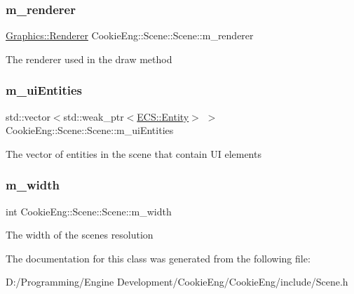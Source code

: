 \subsubsection{\texorpdfstring{m\+\_\+renderer}{m\_renderer}}
{\footnotesize\ttfamily \hyperlink{class_cookie_eng_1_1_graphics_1_1_renderer}{Graphics\+::\+Renderer} Cookie\+Eng\+::\+Scene\+::\+Scene\+::m\+\_\+renderer\hspace{0.3cm}{\ttfamily [protected]}}

The renderer used in the draw method \mbox{\label{class_cookie_eng_1_1_scene_1_1_scene_a8f1b8723deba48f2d685008cbf1f14a2}} 
\subsubsection{\texorpdfstring{m\+\_\+ui\+Entities}{m\_uiEntities}}
{\footnotesize\ttfamily std\+::vector$<$std\+::weak\+\_\+ptr$<$\hyperlink{class_cookie_eng_1_1_e_c_s_1_1_entity}{E\+C\+S\+::\+Entity}$>$ $>$ Cookie\+Eng\+::\+Scene\+::\+Scene\+::m\+\_\+ui\+Entities\hspace{0.3cm}{\ttfamily [protected]}}

The vector of entities in the scene that contain UI elements \mbox{\label{class_cookie_eng_1_1_scene_1_1_scene_a1990da3f0d067d2b542aa6b8fc6f0d43}} 
\subsubsection{\texorpdfstring{m\+\_\+width}{m\_width}}
{\footnotesize\ttfamily int Cookie\+Eng\+::\+Scene\+::\+Scene\+::m\+\_\+width\hspace{0.3cm}{\ttfamily [protected]}}

The width of the scene\textquotesingle{}s resolution 

The documentation for this class was generated from the following file\+:\begin{DoxyCompactItemize}
\item 
D\+:/\+Programming/\+Engine Development/\+Cookie\+Eng/\+Cookie\+Eng/include/Scene.\+h\end{DoxyCompactItemize}
